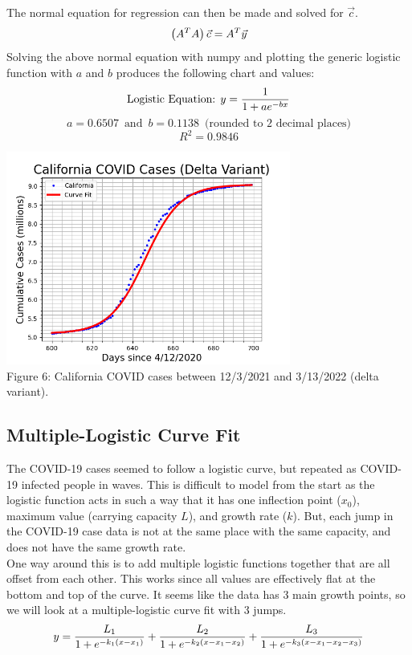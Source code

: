 \documentclass[12pt]{article}
\begin{document}
\noindent The normal equation for regression can then be made and solved for $\vec{c}$. \\
\[
\displaystyle\left(A^{T}A\right)\vec{c}=A^{T}\vec{y} \\
\]
Solving the above normal equation with numpy and plotting the generic logistic function with $a$ and $b$ produces the following chart and values:
\[
\text{Logistic Equation: } y=\frac{1}{1+ae^{-bx}} \\
\]
\[
a = 0.6507 \,\text{ and }\, b = 0.1138 \,\text{ (rounded to 2 decimal places)}
\]
\[
R^{2}=0.9846
\]
\begin{center}
\includegraphics[width = 0.7\textwidth]{california delta.png} \\
Figure 6: California COVID cases between 12/3/2021 and 3/13/2022 (delta variant).
\end{center}

\pagebreak

\subsection{Multiple-Logistic Curve Fit}
The COVID-19 cases seemed to follow a logistic curve, but repeated as COVID-19 infected people in waves. This is difficult to model from the start as the logistic function acts in such a way that it has one inflection point ($x_{0}$), maximum value (carrying capacity $L$), and growth rate ($k$). But, each jump in the COVID-19 case data is not at the same place with the same capacity, and does not have the same growth rate. \\

\noindent One way around this is to add multiple logistic functions together that are all offset from each other. This works since all values are effectively flat at the bottom and top of the curve. It seems like the data has 3 main growth points, so we will look at a multiple-logistic curve fit with 3 jumps.
\[
\displaystyle y = 
\frac{L_{1}}{1+e^{-k_{1}(x-x_{1})}} + 
\frac{L_{2}}{1+e^{-k_{2}(x-x_{1}-x_{2})}} +
\frac{L_{3}}{1+e^{-k_{3}(x-x_{1}-x_{2}-x_{3})}} \\
\]
\end{document}
